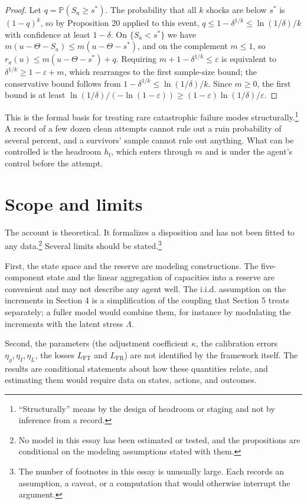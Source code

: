 \documentclass[11pt]{article}
\theoremstyle{remark}
\renewcommand{\Pr}{\mathbb{P}}
\begin{document}
\begin{proof}
Let $q=\Pr(S_a\ge s^\ast)$. The probability that all $k$ shocks are below $s^\ast$ is $(1-q)^k$, so by Proposition 20 applied to this event, $q\le1-\delta^{1/k}\le\ln(1/\delta)/k$ with confidence at least $1-\delta$. On $\{S_a<s^\ast\}$ we have $m(u-\Theta-S_a)\le m(u-\Theta-s^\ast)$, and on the complement $m\le1$, so $r_a(u)\le m(u-\Theta-s^\ast)+q$. Requiring $m+1-\delta^{1/k}\le\varepsilon$ is equivalent to $\delta^{1/k}\ge1-\varepsilon+m$, which rearranges to the first sample-size bound; the conservative bound follows from $1-\delta^{1/k}\le\ln(1/\delta)/k$. Since $m\ge0$, the first bound is at least $\ln(1/\delta)/(-\ln(1-\varepsilon))\ge(1-\varepsilon)\ln(1/\delta)/\varepsilon$.
\end{proof}

This is the formal basis for treating rare catastrophic failure modes structurally.\footnote{``Structurally'' means by the design of headroom or staging and not by inference from a record.} A record of a few dozen clean attempts cannot rule out a ruin probability of several percent, and a survivors' sample cannot rule out anything. What can be controlled is the headroom $h_{\mathrm f}$, which enters through $m$ and is under the agent's control before the attempt.

\section{Scope and limits}

The account is theoretical. It formalizes a disposition and has not been fitted to any data.\footnote{No model in this essay has been estimated or tested, and the propositions are conditional on the modeling assumptions stated with them.} Several limits should be stated.\footnote{The number of footnotes in this essay is unusually large. Each records an assumption, a caveat, or a computation that would otherwise interrupt the argument.}

First, the state space and the reserve are modeling constructions. The five-component state and the linear aggregation of capacities into a reserve are convenient and may not describe any agent well. The i.i.d. assumption on the increments in Section 4 is a simplification of the coupling that Section 5 treats separately; a fuller model would combine them, for instance by modulating the increments with the latent stress $\Lambda$.

Second, the parameters (the adjustment coefficient $\kappa$, the calibration errors $\eta_\varrho,\eta_I,\eta_L$, the losses $L_{\mathrm{FT}}$ and $L_{\mathrm{FR}}$) are not identified by the framework itself. The results are conditional statements about how these quantities relate, and estimating them would require data on states, actions, and outcomes.
\end{document}
